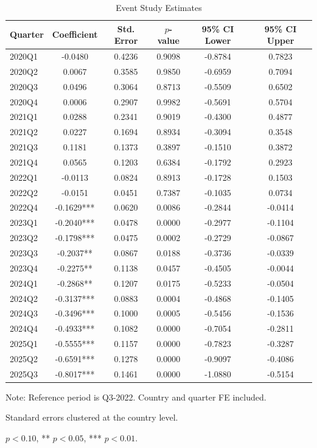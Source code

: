 \begin{table}[htbp]
\centering
\caption{Event Study Estimates}
\label{tab:event_study}
\begin{tabular}{lccccc}
\toprule
Quarter & Coefficient & Std. Error & $p$-value & 95\% CI Lower & 95\% CI Upper \\
\midrule
2020Q1 & -0.0480 & 0.4236 & 0.9098 & -0.8784 & 0.7823 \\
2020Q2 & 0.0067 & 0.3585 & 0.9850 & -0.6959 & 0.7094 \\
2020Q3 & 0.0496 & 0.3064 & 0.8713 & -0.5509 & 0.6502 \\
2020Q4 & 0.0006 & 0.2907 & 0.9982 & -0.5691 & 0.5704 \\
2021Q1 & 0.0288 & 0.2341 & 0.9019 & -0.4300 & 0.4877 \\
2021Q2 & 0.0227 & 0.1694 & 0.8934 & -0.3094 & 0.3548 \\
2021Q3 & 0.1181 & 0.1373 & 0.3897 & -0.1510 & 0.3872 \\
2021Q4 & 0.0565 & 0.1203 & 0.6384 & -0.1792 & 0.2923 \\
2022Q1 & -0.0113 & 0.0824 & 0.8913 & -0.1728 & 0.1503 \\
2022Q2 & -0.0151 & 0.0451 & 0.7387 & -0.1035 & 0.0734 \\
2022Q4 & -0.1629*** & 0.0620 & 0.0086 & -0.2844 & -0.0414 \\
2023Q1 & -0.2040*** & 0.0478 & 0.0000 & -0.2977 & -0.1104 \\
2023Q2 & -0.1798*** & 0.0475 & 0.0002 & -0.2729 & -0.0867 \\
2023Q3 & -0.2037** & 0.0867 & 0.0188 & -0.3736 & -0.0339 \\
2023Q4 & -0.2275** & 0.1138 & 0.0457 & -0.4505 & -0.0044 \\
2024Q1 & -0.2868** & 0.1207 & 0.0175 & -0.5233 & -0.0504 \\
2024Q2 & -0.3137*** & 0.0883 & 0.0004 & -0.4868 & -0.1405 \\
2024Q3 & -0.3496*** & 0.1000 & 0.0005 & -0.5456 & -0.1536 \\
2024Q4 & -0.4933*** & 0.1082 & 0.0000 & -0.7054 & -0.2811 \\
2025Q1 & -0.5555*** & 0.1157 & 0.0000 & -0.7823 & -0.3287 \\
2025Q2 & -0.6591*** & 0.1278 & 0.0000 & -0.9097 & -0.4086 \\
2025Q3 & -0.8017*** & 0.1461 & 0.0000 & -1.0880 & -0.5154 \\
\bottomrule
\end{tabular}
\begin{tablenotes}
\small
\item Note: Reference period is Q3-2022. Country and quarter FE included.
\item Standard errors clustered at the country level.
\item * $p<0.10$, ** $p<0.05$, *** $p<0.01$.
\end{tablenotes}
\end{table}